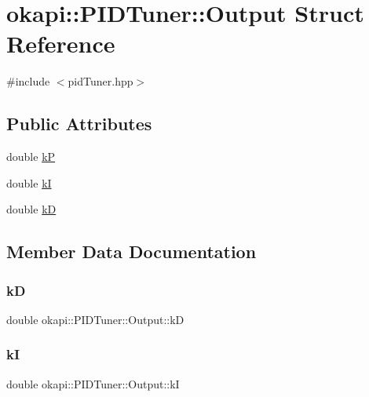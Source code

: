 \hypertarget{structokapi_1_1PIDTuner_1_1Output}{}\section{okapi\+::P\+I\+D\+Tuner\+::Output Struct Reference}
\label{structokapi_1_1PIDTuner_1_1Output}


{\ttfamily \#include $<$pid\+Tuner.\+hpp$>$}

\subsection*{Public Attributes}
\begin{DoxyCompactItemize}
\item 
double \mbox{\hyperlink{structokapi_1_1PIDTuner_1_1Output_ac692f4d0b2eac40a7666718d484c172a}{kP}}
\item 
double \mbox{\hyperlink{structokapi_1_1PIDTuner_1_1Output_a30a8572d976d01e2ce855ae39251bc79}{kI}}
\item 
double \mbox{\hyperlink{structokapi_1_1PIDTuner_1_1Output_a1b3d2be54d0aecaeeb2aaf4a97c7c5c8}{kD}}
\end{DoxyCompactItemize}


\subsection{Member Data Documentation}
\mbox{\label{structokapi_1_1PIDTuner_1_1Output_a1b3d2be54d0aecaeeb2aaf4a97c7c5c8}} 
\subsubsection{\texorpdfstring{kD}{kD}}
{\footnotesize\ttfamily double okapi\+::\+P\+I\+D\+Tuner\+::\+Output\+::kD}

\mbox{\label{structokapi_1_1PIDTuner_1_1Output_a30a8572d976d01e2ce855ae39251bc79}} 
\subsubsection{\texorpdfstring{kI}{kI}}
{\footnotesize\ttfamily double okapi\+::\+P\+I\+D\+Tuner\+::\+Output\+::kI}

